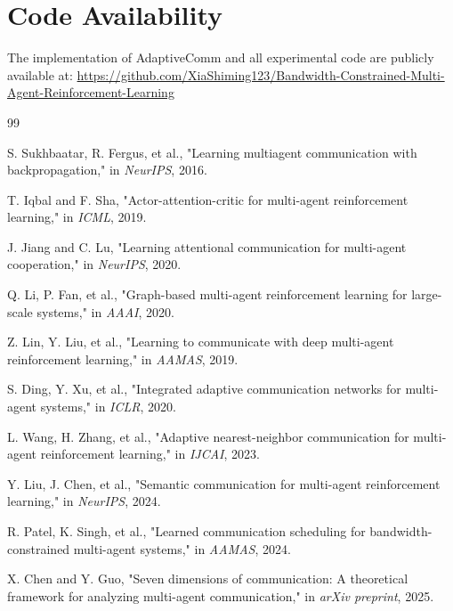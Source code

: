\documentclass[10pt, twocolumn]{IEEEtran}
\begin{document}
\section*{Code Availability}
The implementation of AdaptiveComm and all experimental code are publicly available at: \url{https://github.com/XiaShiming123/Bandwidth-Constrained-Multi-Agent-Reinforcement-Learning}

\begin{thebibliography}{99}

S. Sukhbaatar, R. Fergus, et al., "Learning multiagent communication with backpropagation," in \textit{NeurIPS}, 2016.

T. Iqbal and F. Sha, "Actor-attention-critic for multi-agent reinforcement learning," in \textit{ICML}, 2019.

J. Jiang and C. Lu, "Learning attentional communication for multi-agent cooperation," in \textit{NeurIPS}, 2020.

Q. Li, P. Fan, et al., "Graph-based multi-agent reinforcement learning for large-scale systems," in \textit{AAAI}, 2020.

Z. Lin, Y. Liu, et al., "Learning to communicate with deep multi-agent reinforcement learning," in \textit{AAMAS}, 2019.

S. Ding, Y. Xu, et al., "Integrated adaptive communication networks for multi-agent systems," in \textit{ICLR}, 2020.

L. Wang, H. Zhang, et al., "Adaptive nearest-neighbor communication for multi-agent reinforcement learning," in \textit{IJCAI}, 2023.

Y. Liu, J. Chen, et al., "Semantic communication for multi-agent reinforcement learning," in \textit{NeurIPS}, 2024.

R. Patel, K. Singh, et al., "Learned communication scheduling for bandwidth-constrained multi-agent systems," in \textit{AAMAS}, 2024.

X. Chen and Y. Guo, "Seven dimensions of communication: A theoretical framework for analyzing multi-agent communication," in \textit{arXiv preprint}, 2025.

\end{thebibliography}
\end{document}
